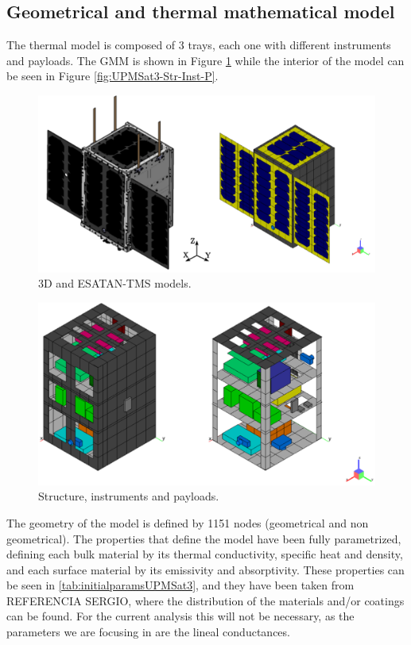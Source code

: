 \subsection{Geometrical and thermal mathematical model}
The thermal model is composed of 3 trays, each one with different instruments and payloads.  The GMM is shown in Figure \ref{fig:UPMSat3-GMM} while the interior of the model can be seen in  Figure \ref{fig:UPMSat3-Str-Inst-P}.
\begin{figure}[H]
    \centering
    \includegraphics[width = \textwidth]{Figures/UPMSat3/3DandESATAN-TNSmodel.png}
    \caption{3D and ESATAN-TMS models.}
    \label{fig:UPMSat3-GMM}
\end{figure}
\begin{figure}[H]
    \centering
    \includegraphics[width = \textwidth]{Figures/UPMSat3/str-inst-PL ESATANmodels.png}
    \caption{Structure, instruments and payloads.}
    \label{fig:UPMSat3-Str-Inst-PL}
\end{figure}

The geometry of the model is defined by 1151 nodes (geometrical and non geometrical). The properties that define the model have been fully parametrized, defining each bulk material by its thermal conductivity, specific heat and density, and each surface material by its emissivity and absorptivity. These properties can be seen in \autoref{tab:initialparamsUPMSat3}, and they have been taken from REFERENCIA SERGIO, where the distribution of the materials and/or coatings can be found. For the current analysis this will not be necessary, as the parameters we are focusing in are the lineal conductances. 
